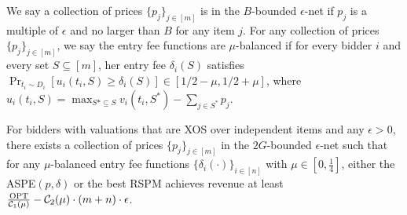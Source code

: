 \begin{definition}\label{def:eps mu ASPE}
	We say a collection of prices $\{p_j\}_{j\in[m]}$ is in the $B$-bounded $\epsilon$-net if $p_j$ is a multiple of $\epsilon$ and no larger than $B$ for any item $j$. For any collection of prices $\{p_j\}_{j\in[m]}$, we say the entry fee functions are $\mu$-balanced if for every bidder $i$ and every set $S\subseteq [m]$, her entry fee $\delta_i(S)$ satisfies  $\Pr_{t_i\sim D_i}[u_i(t_i,S)\geq \delta_i(S)]\in [1/2-\mu,1/2+\mu]$, where $u_i(t_i,S) = \max_{S*\subseteq S} v_i(t_i,S^*)-\sum_{j\in S^*} p_j$.
\end{definition}

\begin{corollary}\label{cor:discretization of prices}
	For  bidders with valuations that are XOS over independent items and any $\epsilon>0$, there exists a collection of prices $\{p_j\}_{j\in[m]}$ in the $2G$-bounded $\epsilon$-net such that for any $\mu$-balanced entry fee functions $\{\delta_i(\cdot)\}_{i\in[n]}$ with $\mu\in[0,\frac{1}{4}]$, either the ASPE$(p,\delta)$ or the best RSPM achieves revenue at least $\frac{\text{OPT}}{{\mathcal{C}}_1(\mu)}-{\mathcal{C}}_2(\mu)\cdot (m+n)\cdot \epsilon$. %
\end{corollary}


